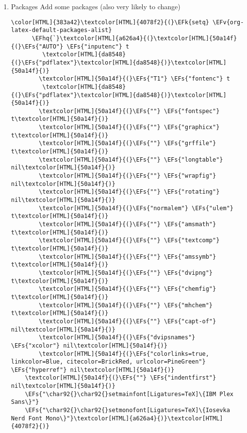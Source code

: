 \documentclass{scrartcl}
\newcommand{\EFk}[1]{\textcolor{EFk}{#1}} %
\newcommand{\EFs}[1]{\textcolor{EFs}{#1}} %
\newcommand{\EFv}[1]{\textcolor{EFv}{#1}} %
\newcommand{\EFhq}[1]{\textcolor{EFhq}{#1}} %
\begin{document}
\begin{enumerate}
\item Packages
\label{sec:org004648f}
Add some packages (also very likely to change)
\begin{Code}
\begin{Verbatim}[]
\color[HTML]{383a42}\textcolor[HTML]{4078f2}{(}\EFk{setq} \EFv{org-latex-default-packages-alist}
      \EFhq{`}\textcolor[HTML]{a626a4}{(}\textcolor[HTML]{50a14f}{(}\EFs{"AUTO"} \EFs{"inputenc"} t
         \textcolor[HTML]{da8548}{(}\EFs{"pdflatex"}\textcolor[HTML]{da8548}{)}\textcolor[HTML]{50a14f}{)}
        \textcolor[HTML]{50a14f}{(}\EFs{"T1"} \EFs{"fontenc"} t
         \textcolor[HTML]{da8548}{(}\EFs{"pdflatex"}\textcolor[HTML]{da8548}{)}\textcolor[HTML]{50a14f}{)}
        \textcolor[HTML]{50a14f}{(}\EFs{""} \EFs{"fontspec"} t\textcolor[HTML]{50a14f}{)}
        \textcolor[HTML]{50a14f}{(}\EFs{""} \EFs{"graphicx"} t\textcolor[HTML]{50a14f}{)}
        \textcolor[HTML]{50a14f}{(}\EFs{""} \EFs{"grffile"} t\textcolor[HTML]{50a14f}{)}
        \textcolor[HTML]{50a14f}{(}\EFs{""} \EFs{"longtable"} nil\textcolor[HTML]{50a14f}{)}
        \textcolor[HTML]{50a14f}{(}\EFs{""} \EFs{"wrapfig"} nil\textcolor[HTML]{50a14f}{)}
        \textcolor[HTML]{50a14f}{(}\EFs{""} \EFs{"rotating"} nil\textcolor[HTML]{50a14f}{)}
        \textcolor[HTML]{50a14f}{(}\EFs{"normalem"} \EFs{"ulem"} t\textcolor[HTML]{50a14f}{)}
        \textcolor[HTML]{50a14f}{(}\EFs{""} \EFs{"amsmath"} t\textcolor[HTML]{50a14f}{)}
        \textcolor[HTML]{50a14f}{(}\EFs{""} \EFs{"textcomp"} t\textcolor[HTML]{50a14f}{)}
        \textcolor[HTML]{50a14f}{(}\EFs{""} \EFs{"amssymb"} t\textcolor[HTML]{50a14f}{)}
        \textcolor[HTML]{50a14f}{(}\EFs{""} \EFs{"dvipng"} t\textcolor[HTML]{50a14f}{)}
        \textcolor[HTML]{50a14f}{(}\EFs{""} \EFs{"chemfig"} t\textcolor[HTML]{50a14f}{)}
        \textcolor[HTML]{50a14f}{(}\EFs{""} \EFs{"mhchem"} t\textcolor[HTML]{50a14f}{)}
        \textcolor[HTML]{50a14f}{(}\EFs{""} \EFs{"capt-of"} nil\textcolor[HTML]{50a14f}{)}
        \textcolor[HTML]{50a14f}{(}\EFs{"dvipsnames"} \EFs{"xcolor"} nil\textcolor[HTML]{50a14f}{)}
        \textcolor[HTML]{50a14f}{(}\EFs{"colorlinks=true, linkcolor=Blue, citecolor=BrickRed, urlcolor=PineGreen"} \EFs{"hyperref"} nil\textcolor[HTML]{50a14f}{)}
    \textcolor[HTML]{50a14f}{(}\EFs{""} \EFs{"indentfirst"} nil\textcolor[HTML]{50a14f}{)}
    \EFs{"\char92{}\char92{}setmainfont[Ligatures=TeX]\{IBM Plex Sans\}"}
    \EFs{"\char92{}\char92{}setmonofont[Ligatures=TeX]\{Iosevka Nerd Font Mono\}"}\textcolor[HTML]{a626a4}{)}\textcolor[HTML]{4078f2}{)}
\end{Verbatim}
\end{Code}


\end{enumerate}
\end{document}
